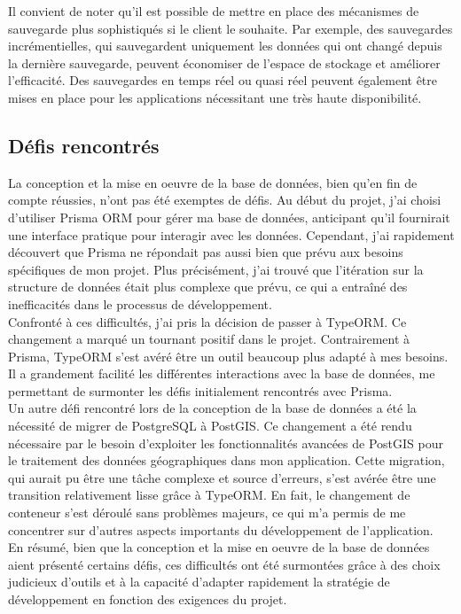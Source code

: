 Il convient de noter qu'il est possible de mettre en place des mécanismes de sauvegarde plus sophistiqués si le client le souhaite.
Par exemple, des sauvegardes incrémentielles, qui sauvegardent uniquement les données qui ont changé depuis la dernière sauvegarde, peuvent économiser de l'espace de stockage et améliorer l'efficacité.
Des sauvegardes en temps réel ou quasi réel peuvent également être mises en place pour les applications nécessitant une très haute disponibilité.\\

\subsection{Défis rencontrés}\label{subsec:challenges}
La conception et la mise en oeuvre de la base de données, bien qu'en fin de compte réussies, n'ont pas été exemptes de défis.
Au début du projet, j'ai choisi d'utiliser Prisma ORM pour gérer ma base de données, anticipant qu'il fournirait une interface pratique pour interagir avec les données.
Cependant, j'ai rapidement découvert que Prisma ne répondait pas aussi bien que prévu aux besoins spécifiques de mon projet.
Plus précisément, j'ai trouvé que l'itération sur la structure de données était plus complexe que prévu, ce qui a entraîné des inefficacités dans le processus de développement.\\

Confronté à ces difficultés, j'ai pris la décision de passer à TypeORM. Ce changement a marqué un tournant positif dans le projet.
Contrairement à Prisma, TypeORM s'est avéré être un outil beaucoup plus adapté à mes besoins.
Il a grandement facilité les différentes interactions avec la base de données, me permettant de surmonter les défis initialement rencontrés avec Prisma.\\

Un autre défi rencontré lors de la conception de la base de données a été la nécessité de migrer de PostgreSQL à PostGIS.
Ce changement a été rendu nécessaire par le besoin d'exploiter les fonctionnalités avancées de PostGIS pour le traitement des données géographiques dans mon application.
Cette migration, qui aurait pu être une tâche complexe et source d'erreurs, s'est avérée être une transition relativement lisse grâce à TypeORM. En fait,
le changement de conteneur s'est déroulé sans problèmes majeurs, ce qui m'a permis de me concentrer sur d'autres aspects importants du développement de l'application.\\

En résumé, bien que la conception et la mise en oeuvre de la base de données aient présenté certains défis,
ces difficultés ont été surmontées grâce à des choix judicieux d'outils et à la capacité d'adapter rapidement la stratégie
de développement en fonction des exigences du projet.\\